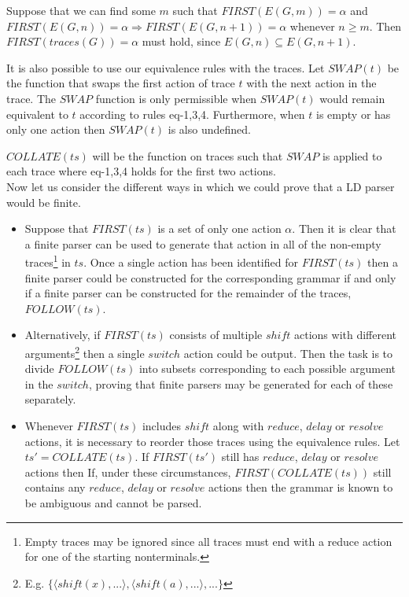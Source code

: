 \documentclass[A4]{sig-alternate}
\begin{document}
Suppose that we can find some $m$ such that $F\!I\!RST(E(G,m)) = \alpha$ and $F\!I\!RST(E(G,n)) = \alpha \Rightarrow FIRST(E(G,n+1)) = \alpha$ whenever $n \geq m$.
Then $F\!I\!RST(traces(G)) = \alpha$ must hold, since $E(G,n) \subseteq E(G, n+1)$.

It is also possible to use our equivalence rules with the traces. 
Let $SW\!AP(t)$ be the function that swaps the first action of trace $t$ with the next action in the trace.
The $SW\!AP$ function is only permissible when $SW\!AP(t)$ would remain equivalent to $t$ according to rules eq-1,3,4.
Furthermore, when $t$ is empty or has only one action then $SW\!AP(t)$ is also undefined.

$COLLATE(ts)$ will be the function on traces such that $SW\!AP$ is applied to each trace where eq-1,3,4 holds for the first two actions. \\

Now let us consider the different ways in which we could prove that a LD parser would be finite.
\begin{itemize}
  \item Suppose that $F\!I\!RST(ts)$ is a set of only one action $\alpha$. 
        Then it is clear that a finite parser can be used to generate that action in all of the non-empty traces\footnote{Empty traces may be ignored since all traces must end with a reduce action for one of the starting nonterminals.} in $ts$.
        Once a single action has been identified for $F\!I\!RST(ts)$ then a finite parser could be constructed for the corresponding grammar if and only if a finite parser can be constructed for the remainder of the traces, $FOLLOW(ts)$.

  \item Alternatively, if $F\!I\!RST(ts)$ consists of multiple $shi\!ft$ actions with different arguments\footnote{E.g. $\{\langle shi\!ft(x), ... \rangle, \langle shi\!ft(a), ... \rangle, ... \}$} then 
        a single $switch$ action could be output. Then the task is to divide $FOLLOW(ts)$ into subsets corresponding to each possible argument in the $switch$, proving that finite parsers may be generated for each of these separately.

  \item Whenever $F\!I\!RST(ts)$ includes $shi\!ft$ along with $reduce$, $delay$ or $resolve$ actions, it is necessary to reorder those traces using the equivalence rules.
        Let $ts' = COLLATE(ts)$. If $F\!I\!RST(ts')$ still has $reduce$, $delay$ or $resolve$ actions then 
        If, under these circumstances, $F\!I\!RST(COLLATE(ts))$ still contains any $reduce$, $delay$ or $resolve$ actions then the grammar is known to be ambiguous and cannot be parsed.
\end{itemize}
\end{document}
